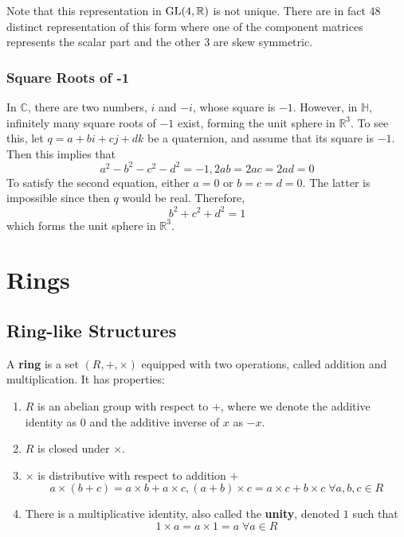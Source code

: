     Note that this representation in $\operatorname{GL}(4, \mathbb{R})$ is not unique. There are in fact 48 distinct representation of this form where one of the component matrices represents the scalar part and the other 3 are skew symmetric. 

  \subsubsection{Square Roots of -1}

    In $\mathbb{C}$, there are two numbers, $i$ and $-i$, whose square is $-1$. However, in $\mathbb{H}$, infinitely many square roots of $-1$ exist, forming the unit sphere in $\mathbb{R}^3$. To see this, let $q = a+bi+cj+dk$ be a quaternion, and assume that its square is $-1$. Then this implies that
    \begin{equation}
      a^2 - b^2 -c^2 -d^2 = -1, 2ab = 2ac = 2ad = 0
    \end{equation}
    To satisfy the second equation, either $a=0$ or $b=c=d=0$. The latter is impossible since then $q$ would be real. Therefore, 
    \begin{equation}
      b^2 + c^2 + d^2 = 1
    \end{equation}
    which forms the unit sphere in $\mathbb{R}^3$. 
\section{Rings}

  \subsection{Ring-like Structures}

    \begin{definition}[Ring]
      A \textbf{ring} is a set $(R, +, \times)$ equipped with two operations, called addition and multiplication. It has properties: 
      \begin{enumerate}
        \item $R$ is an abelian group with respect to $+$, where we denote the additive identity as $0$ and the additive inverse of $x$ as $-x$. 
        \item $R$ is closed under $\times$.
        \item $\times$ is distributive with respect to addition $+$
          \begin{equation}
            a \times (b + c) = a\times b + a\times c, (a+b)\times c = a\times c + b\times c \; \forall a, b, c \in R
          \end{equation}
        \item There is a multiplicative identity, also called the \textbf{unity}, denoted $1$ such that 
          \begin{equation}
            1 \times a = a \times 1 = a \; \forall a \in R
          \end{equation}
      \end{enumerate}
    \end{definition}

